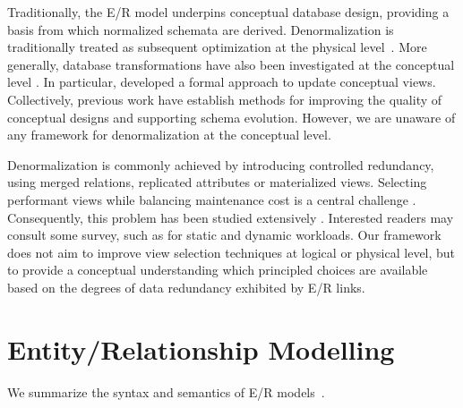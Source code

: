 \documentclass[sigconf]{acmart}
\begin{document}
Traditionally, the E/R model \cite{Chen_76_ER_Model, DBLP:books/daglib/0001129} underpins conceptual database design, providing a basis from which normalized schemata are derived. Denormalization is traditionally treated as subsequent optimization at the physical level~\cite{Batini_92_Conceptual_DB_Design}. More generally, database transformations have also been investigated at the conceptual level \cite{Ling_94_A_Normal_Form_OO_ER_Diagram, Ling_96_View_Update_In_ER_Approach, Rauh_95_Transformations_for_Normalization_of_ER_Schema, Hainaut_91_Entity_Generating_Schema_Transformations_for_ER_Model, Fahrner_95_Survey_DB_ERM_Based_Transformation}. In particular, \cite{Ling_96_View_Update_In_ER_Approach} developed a formal approach to update conceptual views. Collectively, previous work have establish methods for improving the quality of conceptual designs and supporting schema evolution. However, we are unaware of any framework for denormalization at the conceptual level.

Denormalization is commonly achieved by introducing controlled redundancy, using merged relations, replicated attributes or materialized views. Selecting performant views while balancing maintenance cost is a central challenge \cite{Gupta_95_Maintenance_Materialized_Views}. Consequently, this problem has been studied extensively \cite {Mami_11_View_Selection_Constraint_Satisfaction, Zhang_01_Evolutionary_Approach_View_Selection_DW, Zhang_99_Genetic_Algorithm_View_Selection_DW, Gupta_99_View_Selection_Maintenance_Cost_Constraint, Agrawal_00_Automated_View_Selection_and_Indexes_SQL, Mistry_01_View_Selection_Multi_Query_Optimization,Srinivasarao_22_Multi-Objective_MV_Selection_Flamingo_Search_Algorithm, Kechar_22_ZigZag_Plus_Global_Optimization_Algorithm_For_View_Selection}. Interested readers may consult some survey, such as \cite{Mami_12_Survey_of_View_Selection} for static and dynamic workloads. Our framework does not aim to improve view selection techniques at logical or physical level, but to provide a conceptual understanding which principled choices are available based on the degrees of data redundancy exhibited by E/R links.

\section{Entity/Relationship Modelling}\label{sec:er-model}

We summarize the syntax and semantics of E/R models~\cite{DBLP:books/daglib/0001129}.
\end{document}
